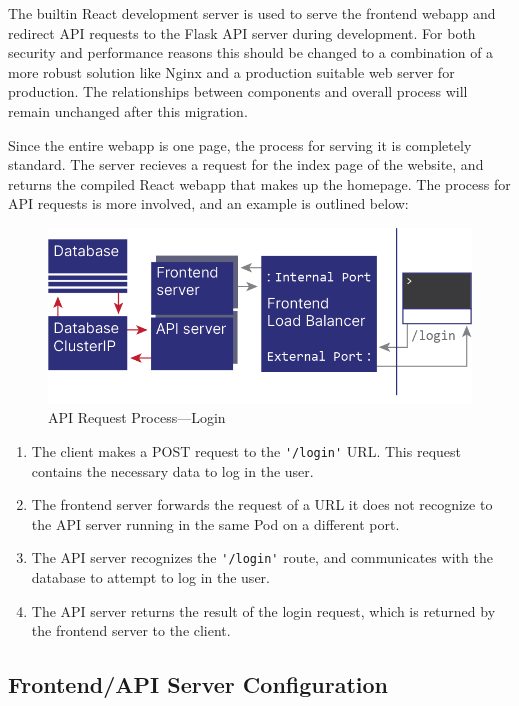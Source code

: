 \documentclass[12pt]{article}
\begin{document}
The builtin React development server is used to serve the frontend
webapp and redirect API requests to the Flask API server during
development.  For both security and performance reasons this should be
changed to a combination of a more robust solution like Nginx
\cite{nginx} and a production suitable web server for production.  The
relationships between components and overall process will remain
unchanged after this migration.
\par

Since the entire webapp is one page, the process for serving it is
completely standard.  The server recieves a request for the index page
of the website, and returns the compiled React webapp that makes up
the homepage.  The process for API requests is more involved, and an
example is outlined below:

\begin{figure}[h!]

  \includegraphics[scale=1]{login_request}
  \centering
  \caption{API Request Process---Login}
  \label{rr:detailed}
\end{figure}

\begin{enumerate}
\item The client makes a POST request to the \lstinline{'/login'} URL.
  This request contains the necessary data to log in the user.
\item The frontend server forwards the request of a URL it does not
  recognize to the API server running in the same Pod on a different
  port.
\item The API server recognizes the \lstinline{'/login'} route, and
  communicates with the database to attempt to log in the user.
\item The API server returns the result of the login request, which is
  returned by the frontend server to the client.
\end{enumerate}

\subsection{Frontend/API Server Configuration}
\end{document}
